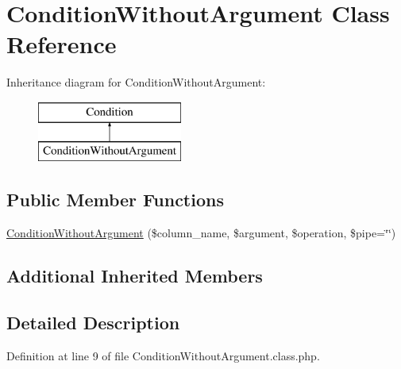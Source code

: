 \hypertarget{classConditionWithoutArgument}{\section{Condition\+Without\+Argument Class Reference}
\label{classConditionWithoutArgument}
}
Inheritance diagram for Condition\+Without\+Argument\+:\begin{figure}[H]
\begin{center}
\leavevmode
\includegraphics[height=2.000000cm]{classConditionWithoutArgument}
\end{center}
\end{figure}
\subsection*{Public Member Functions}
\begin{DoxyCompactItemize}
\item 
\hyperlink{classConditionWithoutArgument_a42d42e70c74111b4980e2916b64c95e7}{Condition\+Without\+Argument} (\$column\+\_\+name, \$argument, \$operation, \$pipe=\char`\"{}\char`\"{})
\end{DoxyCompactItemize}
\subsection*{Additional Inherited Members}


\subsection{Detailed Description}


Definition at line 9 of file Condition\+Without\+Argument.\+class.\+php.



